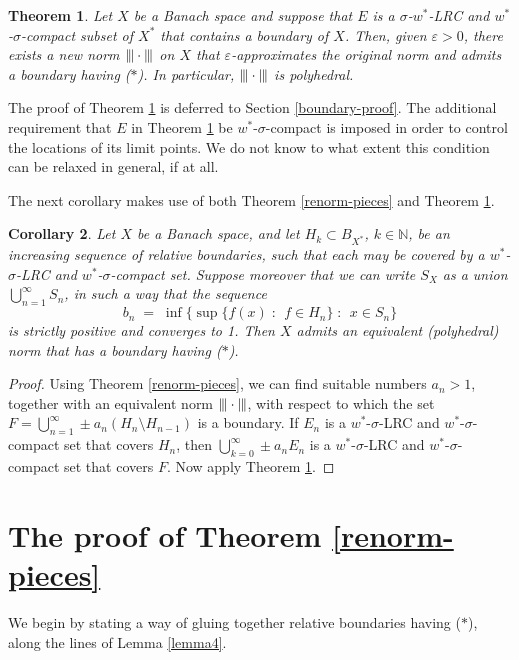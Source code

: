 \documentclass[12pt,a4paper]{amsart}
\newtheorem{theorem}{Theorem}
\newtheorem{corollary}[theorem]{Corollary}
\theoremstyle{definition}
\theoremstyle{remark}
\newcommand{\eps}{\ensuremath{\varepsilon}}
\newcommand{\N}{\mathbb{N}}
\newcommand{\set}[2]{\{{#1} \;:\;\, {#2}\}}
\newcommand{\st}{($*$)}
\newcommand{\tri}{{\displaystyle |\kern-.9pt|\kern-.9pt|}}
\newcommand{\tndot}{\ensuremath{\tri\cdot\tri}}
\begin{document}
\begin{theorem}\label{boundary}
Let $X$ be a Banach space and suppose that $E$ is a
$\sigma$-$w^*$-LRC and $w^*$-$\sigma$-compact subset of $X^*$ that
contains a boundary of $X$. Then, given $\eps>0$, there exists a new
norm $\tndot$ on $X$ that $\eps$-approximates the original norm and
admits a boundary having {\st}. In particular, $\tndot$ is
polyhedral.
\end{theorem}

The proof of Theorem \ref{boundary} is deferred to Section \ref{boundary-proof}.
The additional requirement that $E$ in Theorem \ref{boundary} be
$w^*$-$\sigma$-compact is imposed in order to control the
locations of its limit points. We do not know to what extent this
condition can be relaxed in general, if at all.

The next corollary makes use of both Theorem \ref{renorm-pieces}
and Theorem \ref{boundary}.

\begin{corollary}\label{boundary-pieces}
Let $X$ be a Banach space, and let $H_k \subset B_{X^*}$, $k \in
\N$, be an increasing sequence of relative boundaries, such that
each may be covered by a $w^*$-$\sigma$-LRC and
$w^*$-$\sigma$-compact set. Suppose moreover that we can write $S_X$
as a union $\bigcup_{n=1}^{\infty} S_n$, in such a way that the
sequence
\[
b_n \;=\; \inf\set{\sup\set{f(x)}{f \in H_n}}{x \in S_n}
\]
is strictly positive and converges to 1. Then $X$ admits an
equivalent (polyhedral) norm that has a boundary having {\st}.
\end{corollary}

\begin{proof}
Using Theorem \ref{renorm-pieces}, we can find suitable
numbers $a_n > 1$, together with an equivalent
norm $\tndot$, with respect to which the set $F =
\bigcup_{n=1}^\infty \pm a_n (H_n\setminus H_{n-1})$ is a boundary.
If $E_n$ is a $w^*$-$\sigma$-LRC and $w^*$-$\sigma$-compact set that
covers $H_n$, then $\bigcup_{k=0}^\infty \pm a_n E_n$ is a
$w^*$-$\sigma$-LRC and $w^*$-$\sigma$-compact set that covers $F$.
Now apply Theorem \ref{boundary}.
\end{proof}

\section{The proof of Theorem \ref{renorm-pieces}}\label{pieces-proof}

We begin by stating a way of gluing together relative boundaries having
{\st}, along the lines of Lemma \ref{lemma4}.
\end{document}
